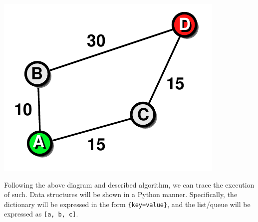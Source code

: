 \documentclass[letterpaper, 12pt]{article}
\begin{document}
\begin{multicols}{2}
\includegraphics[width=\columnwidth]{img/dijksra.pdf}

\newcommand{\pydict}[1]{\texttt{\{#1\}}}
\newcommand{\pylist}[1]{\texttt{[#1]}}
\newcommand{\pyinf}{\(\mathtt{\infty}\)}

Following the above diagram and described algorithm, we can trace the execution
of such. Data structures will be shown in a Python manner. Specifically, the
dictionary will be expressed in the form \pydict{key=value}, and the list/queue
will be expressed as \pylist{a, b, c}.


\end{multicols}
\end{document}

